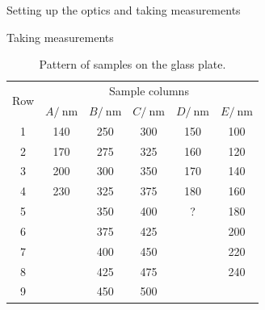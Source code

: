 \documentclass[pdftex, a4paper,11pt, twoside, UKenglish]{report}
\begin{document}
\begin{chapter}{Setting up the optics and taking measurements}
\begin{section}{Taking measurements}
      \begin{table}[htbp]
        \centering
        \begin{tabular}{|c|c|c|c|c|c|}
          \hline
          \multirow{2}{*}{Row} & \multicolumn{5}{|c|}{Sample columns} 
          \\ \cline{2-6}
          & $A /\SI{}{\nano\meter}$ & $B /\SI{}{\nano\meter}$ &
          $C /\SI{}{\nano\meter}$ & $D /\SI{}{\nano\meter}$ &
          $E /\SI{}{\nano\meter}$\\ \hline \hline 
          1 & 140 & 250 & 300 & 150 & 100 \\ \hline 
          2 & 170 & 275 & 325 & 160 & 120 \\ \hline 
          3 & 200 & 300 & 350 & 170 & 140 \\ \hline 
          4 & 230 & 325 & 375 & 180 & 160 \\ \hline 
          5 &  & 350 & 400 & ? & 180 \\ \hline 
          6 &  & 375 & 425 &  & 200 \\ \hline 
          7 &  & 400 & 450 &  & 220 \\ \hline 
          8 &  & 425 & 475 &  & 240 \\ \hline 
          9 &  & 450 & 500 &  &  \\ \hline 
        \end{tabular}
        \caption{Pattern of samples on the glass plate.}
        \label{tab:samplepattern}
      \end{table}
      
    \end{section}
    
  \end{chapter}
  
  
  
\end{document}
